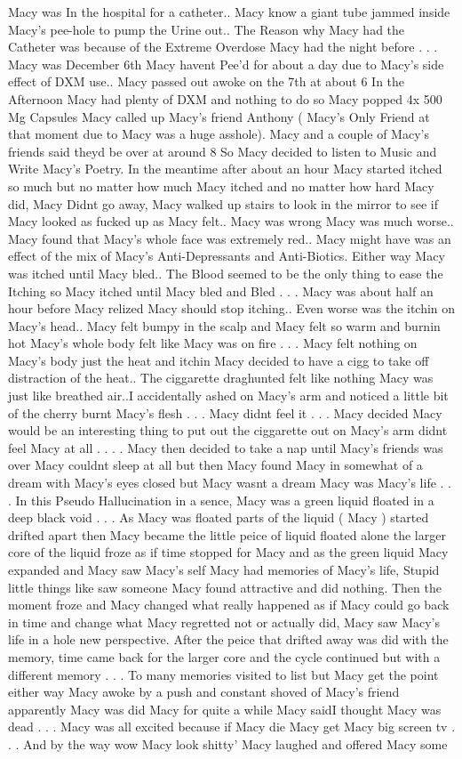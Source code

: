 \documentclass[12pt]{book}
\begin{document}
Macy was In the hospital for a catheter.. Macy know a giant tube jammed inside Macy's pee-hole to pump the Urine out.. The Reason why Macy had the Catheter was because of the Extreme Overdose Macy had the night before . . .  Macy was December 6th Macy havent Pee'd for about a day due to Macy's side effect of DXM use.. Macy passed out awoke on the 7th at about 6 In the Afternoon Macy had plenty of DXM and nothing to do so Macy popped 4x 500 Mg Capsules Macy called up Macy's friend Anthony ( Macy's Only Friend at that moment due to Macy was a huge asshole). Macy and a couple of Macy's friends said theyd be over at around 8 So Macy decided to listen to Music and Write Macy's Poetry. In the meantime after about an hour Macy started itched so much but no matter how much Macy itched and no matter how hard Macy did, Macy Didnt go away, Macy walked up stairs to look in the mirror to see if Macy looked as fucked up as Macy felt.. Macy was wrong Macy was much worse.. Macy found that Macy's whole face was extremely red.. Macy might have was an effect of the mix of Macy's Anti-Depressants and Anti-Biotics. Either way Macy was itched until Macy bled.. The Blood seemed to be the only thing to ease the Itching so Macy itched until Macy bled and Bled . . .  Macy was about half an hour before Macy relized Macy should stop itching.. Even worse was the itchin on Macy's head.. Macy felt bumpy in the scalp and Macy felt so warm and burnin hot Macy's whole body felt like Macy was on fire . . .  Macy felt nothing on Macy's body just the heat and itchin Macy decided to have a cigg to take off distraction of the heat.. The ciggarette draghunted felt like nothing Macy was just like breathed air..I accidentally ashed on Macy's arm and noticed a little bit of the cherry burnt Macy's flesh  . . .  Macy didnt feel it . . .  Macy decided Macy would be an interesting thing to put out the ciggarette out on Macy's arm didnt feel Macy at all . . .  . Macy then decided to take a nap until Macy's friends was over Macy couldnt sleep at all but then Macy found Macy in somewhat of a dream with Macy's eyes closed but Macy wasnt a dream Macy was Macy's life . . .  In this Pseudo Hallucination in a sence, Macy was a green liquid floated in a deep black void . . .  As Macy was floated parts of the liquid ( Macy ) started drifted apart then Macy became the little peice of liquid floated alone the larger core of the liquid froze as if time stopped for Macy and as the green liquid Macy expanded and Macy saw Macy's self Macy had memories of Macy's life, Stupid little things like saw someone Macy found attractive and did nothing. Then the moment froze and Macy changed what really happened as if Macy could go back in time and change what Macy regretted not or actually did, Macy saw Macy's life in a hole new perspective. After the peice that drifted away was did with the memory, time came back for the larger core and the cycle continued but with a different memory . . .  To many memories visited to list but Macy get the point either way Macy awoke by a push and constant shoved of Macy's friend apparently Macy was did Macy for quite a while Macy saidI thought Macy was dead . . .  Macy was all excited because if Macy die Macy get Macy big screen tv . . .  And by the way wow Macy look shitty' Macy laughed and offered Macy some 
\end{document}
